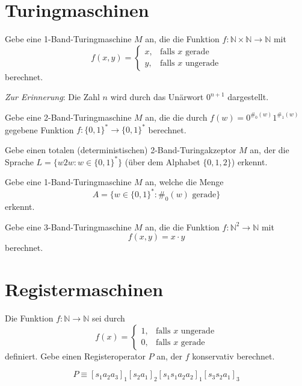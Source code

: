 \documentclass[german,headsepline]{scrartcl}
\begin{document}
	
	\section{Turingmaschinen}
	\begin{question}[subtitle={Klausur 2012}]
		Gebe eine 1-Band-Turingmaschine $M$ an,
		die die Funktion $f:\mathbb{N}\times\mathbb{N}\to\mathbb{N}$ mit
		\[f(x,y)=\begin{cases}
			x, &\text{falls $x$ gerade} \\
			y, &\text{falls $x$ ungerade}
		\end{cases}\]
		berechnet.
		
		\textit{Zur Erinnerung}: Die Zahl $n$ wird durch das Unärwort $0^{n+1}$ dargestellt.
	\end{question}
	
	\begin{question}[subtitle={Klausur 2014}]
		Gebe eine 2-Band-Turingmaschine $M$ an, die die durch $f(w)=0^{\#_0(w)}1^{\#_1(w)}$ gegebene Funktion $f:\{0,1\}^*\to\{0,1\}^*$ berechnet.
	\end{question}
	
	\begin{question}[subtitle={Klausur 2015}]
		Gebe einen totalen (deterministischen) 2-Band-Turingakzeptor $M$ an,
		der die Sprache $L=\{w2w\colon w\in\{0,1\}^*\}$ (über dem Alphabet $\{0,1,2\}$) erkennt.
	\end{question}
	
	\begin{question}[subtitle={Blatt 13, 2015}]
		Gebe eine 1-Band-Turingmaschine $M$ an, welche die Menge
		\[A=\{w\in\{0,1\}^*\colon\#_0(w)\text{ gerade}\}\]
		erkennt.
	\end{question}
	
	\begin{question}
		Gebe eine 3-Band-Turingmaschine $M$ an, die die Funktion $f:\mathbb{N}^2\to\mathbb{N}$ mit
		\[f(x,y)=x\cdot y\]
		berechnet.
	\end{question}
	
	\section{Registermaschinen}
	\begin{question}[subtitle={Klausur 2015}]
		Die Funktion $f:\mathbb{N}\to\mathbb{N}$ sei durch
		\[f(x)=\begin{cases}
			1, &\text{falls $x$ ungerade} \\
			0, &\text{falls $x$ gerade}
		\end{cases}\]
		definiert.
		Gebe einen Registeroperator $P$ an, der $f$ konservativ berechnet.
	\end{question}
	\begin{solution}
		\[P\equiv[s_1a_2a_3]_1[s_2a_1]_2[s_1s_1a_2a_2]_1[s_3s_2a_1]_3\]
	\end{solution}
	
\end{document}
